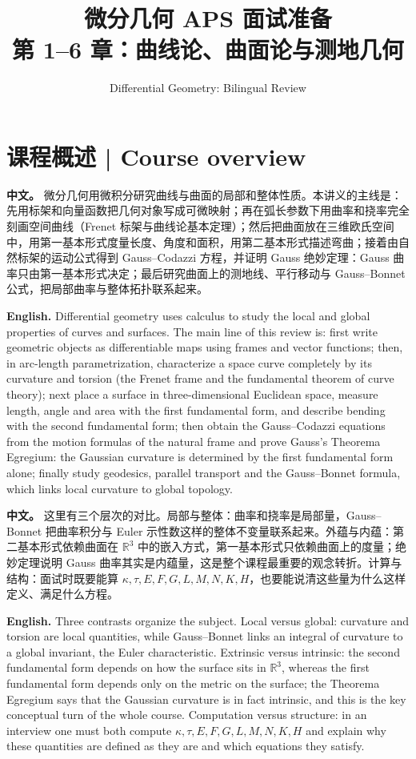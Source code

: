 \documentclass[UTF8,11pt,a4paper]{ctexart}
\title{微分几何 APS 面试准备\\[4pt]\large 第 1--6 章：曲线论、曲面论与测地几何}
\author{Differential Geometry: Bilingual Review}
\date{}
\newcommand{\APS}[2]{\par\noindent\textbf{中文。} #1\par\noindent\textbf{English.} #2\par\smallskip}
\newcommand{\RR}{\mathbb{R}}
\begin{document}
\maketitle

\section*{课程概述 | Course overview}
\APS{微分几何用微积分研究曲线与曲面的局部和整体性质。本讲义的主线是：先用标架和向量函数把几何对象写成可微映射；再在弧长参数下用曲率和挠率完全刻画空间曲线（Frenet 标架与曲线论基本定理）；然后把曲面放在三维欧氏空间中，用第一基本形式度量长度、角度和面积，用第二基本形式描述弯曲；接着由自然标架的运动公式得到 Gauss--Codazzi 方程，并证明 Gauss 绝妙定理：Gauss 曲率只由第一基本形式决定；最后研究曲面上的测地线、平行移动与 Gauss--Bonnet 公式，把局部曲率与整体拓扑联系起来。}{Differential geometry uses calculus to study the local and global properties of curves and surfaces. The main line of this review is: first write geometric objects as differentiable maps using frames and vector functions; then, in arc-length parametrization, characterize a space curve completely by its curvature and torsion (the Frenet frame and the fundamental theorem of curve theory); next place a surface in three-dimensional Euclidean space, measure length, angle and area with the first fundamental form, and describe bending with the second fundamental form; then obtain the Gauss--Codazzi equations from the motion formulas of the natural frame and prove Gauss's Theorema Egregium: the Gaussian curvature is determined by the first fundamental form alone; finally study geodesics, parallel transport and the Gauss--Bonnet formula, which links local curvature to global topology.}
\APS{这里有三个层次的对比。局部与整体：曲率和挠率是局部量，Gauss--Bonnet 把曲率积分与 Euler 示性数这样的整体不变量联系起来。外蕴与内蕴：第二基本形式依赖曲面在 $\RR^3$ 中的嵌入方式，第一基本形式只依赖曲面上的度量；绝妙定理说明 Gauss 曲率其实是内蕴量，这是整个课程最重要的观念转折。计算与结构：面试时既要能算 $\kappa,\tau,E,F,G,L,M,N,K,H$，也要能说清这些量为什么这样定义、满足什么方程。}{Three contrasts organize the subject. Local versus global: curvature and torsion are local quantities, while Gauss--Bonnet links an integral of curvature to a global invariant, the Euler characteristic. Extrinsic versus intrinsic: the second fundamental form depends on how the surface sits in $\RR^3$, whereas the first fundamental form depends only on the metric on the surface; the Theorema Egregium says that the Gaussian curvature is in fact intrinsic, and this is the key conceptual turn of the whole course. Computation versus structure: in an interview one must both compute $\kappa,\tau,E,F,G,L,M,N,K,H$ and explain why these quantities are defined as they are and which equations they satisfy.}
\end{document}
